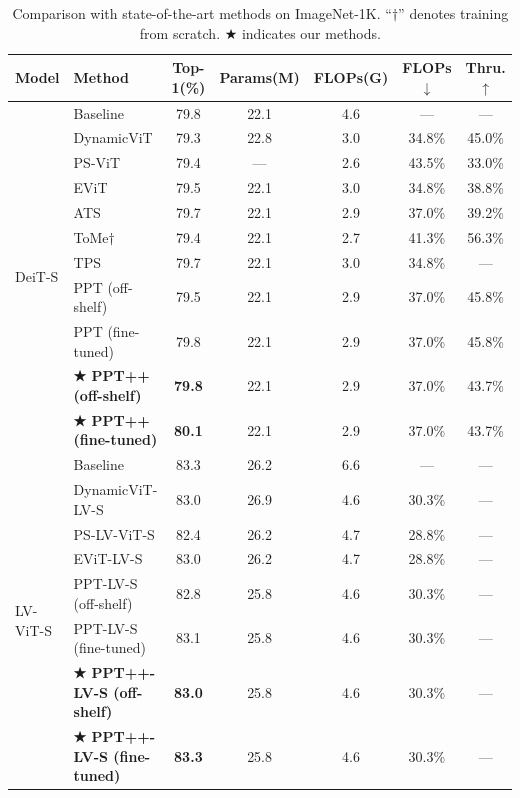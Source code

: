 \documentclass[10pt,twocolumn,letterpaper]{article}
\begin{document}
\begin{table}[t]
\centering
\caption{Comparison with state-of-the-art methods on ImageNet-1K. ``$\dagger$''
denotes training from scratch. ★ indicates our methods.}
\label{tab:main}
\small
\begin{tabular}{llccccc}
\toprule
\textbf{Model} & \textbf{Method} & \textbf{Top-1(\%)} & \textbf{Params(M)} & \textbf{FLOPs(G)} & \textbf{FLOPs$\downarrow$} & \textbf{Thru.$\uparrow$} \\
\midrule
\multirow{11}{*}{DeiT-S} & Baseline & 79.8 & 22.1 & 4.6 & --- & --- \\
 & DynamicViT & 79.3 & 22.8 & 3.0 & 34.8\% & 45.0\% \\
 & PS-ViT & 79.4 & --- & 2.6 & 43.5\% & 33.0\% \\
 & EViT & 79.5 & 22.1 & 3.0 & 34.8\% & 38.8\% \\
 & ATS & 79.7 & 22.1 & 2.9 & 37.0\% & 39.2\% \\
 & ToMe$\dagger$ & 79.4 & 22.1 & 2.7 & 41.3\% & 56.3\% \\
 & TPS & 79.7 & 22.1 & 3.0 & 34.8\% & --- \\
 & PPT (off-shelf) & 79.5 & 22.1 & 2.9 & 37.0\% & 45.8\% \\
 & PPT (fine-tuned) & 79.8 & 22.1 & 2.9 & 37.0\% & 45.8\% \\
 & \textbf{★ PPT++ (off-shelf)} & \textbf{79.8} & 22.1 & 2.9 & 37.0\% & 43.7\% \\
 & \textbf{★ PPT++ (fine-tuned)} & \textbf{80.1} & 22.1 & 2.9 & 37.0\% & 43.7\% \\
\midrule
\multirow{8}{*}{LV-ViT-S} & Baseline & 83.3 & 26.2 & 6.6 & --- & --- \\
 & DynamicViT-LV-S & 83.0 & 26.9 & 4.6 & 30.3\% & --- \\
 & PS-LV-ViT-S & 82.4 & 26.2 & 4.7 & 28.8\% & --- \\
 & EViT-LV-S & 83.0 & 26.2 & 4.7 & 28.8\% & --- \\
 & PPT-LV-S (off-shelf) & 82.8 & 25.8 & 4.6 & 30.3\% & --- \\
 & PPT-LV-S (fine-tuned) & 83.1 & 25.8 & 4.6 & 30.3\% & --- \\
 & \textbf{★ PPT++-LV-S (off-shelf)} & \textbf{83.0} & 25.8 & 4.6 & 30.3\% & --- \\
 & \textbf{★ PPT++-LV-S (fine-tuned)} & \textbf{83.3} & 25.8 & 4.6 & 30.3\% & --- \\
\bottomrule
\end{tabular}
\end{table}
\end{document}
